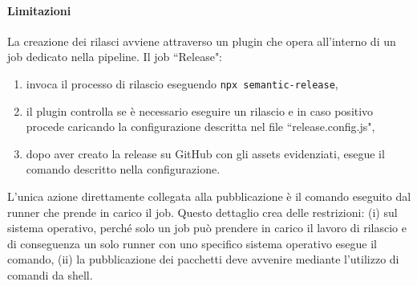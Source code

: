 \paragraph{Limitazioni} La creazione dei rilasci avviene attraverso un plugin che opera all'interno di un job dedicato nella pipeline. Il job ``Release": 
\begin{enumerate}
	\item invoca il processo di rilascio eseguendo \texttt{npx semantic-release},
	\item il plugin controlla se è necessario eseguire un rilascio e in caso positivo procede caricando la configurazione descritta nel file ``release.config.js",
	\item dopo aver creato la release su GitHub con gli assets evidenziati, esegue il comando descritto nella configurazione.
\end{enumerate}
L'unica azione direttamente collegata alla pubblicazione è il comando eseguito dal runner che prende in carico il job. Questo dettaglio crea delle restrizioni: (i) sul sistema operativo, perché solo un job può prendere in carico il lavoro di rilascio e di conseguenza un solo runner con uno specifico sistema operativo esegue il comando, (ii) la pubblicazione dei pacchetti deve avvenire mediante l'utilizzo di comandi da shell.


